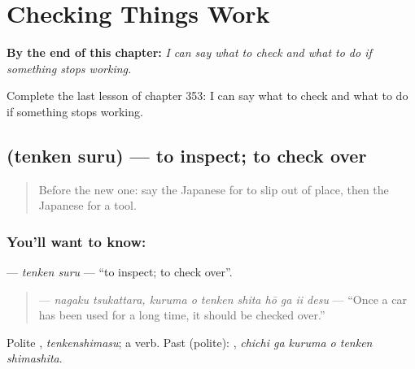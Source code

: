 
\chapter{Checking Things Work}
\label{ch:ja-checking-things-work}

\begin{chapteropening}
\textbf{By the end of this chapter:} \emph{I can say what to check and what to do if something stops working.}

Complete the last lesson of chapter 353: I can say what to check and what to do if something stops working.
\end{chapteropening}

\section[\texorpdfstring{\ja{てんけんする} (tenken suru)}{てんけんする (tenken suru)}]{ (tenken suru) — to inspect; to check over}

\label{lesson:JA-C353-tenken-suru}



\begin{quote}
Before the new one: say the Japanese for to slip out of place, then the Japanese for a tool.
\end{quote}

\subsection*{You'll want to know: }
\textbf{} — \emph{tenken suru} — \textquotedblleft{}to inspect; to check over\textquotedblright{}.

\begin{quote}
\textbf{    } — \emph{nagaku tsukattara, kuruma o tenken shita hō ga ii desu} — \textquotedblleft{}Once a car has been used for a long time, it should be checked over.\textquotedblright{}
\end{quote}

Polite \textbf{}, \emph{tenkenshimasu}; a  verb. Past (polite): \textbf{  }, \emph{chichi ga kuruma o tenken shimashita}.

